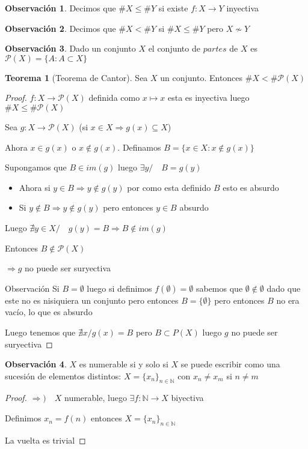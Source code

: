\documentclass[12pt]{article}
\newcommand{\N}{\mathbb{N}}
\newcommand{\Ra}{\Rightarrow}
\newcommand{\ra}{\rightarrow}
\theoremstyle{definition}
\newtheorem*{remark}{Observación}
\newtheorem{theorem}{Teorema}
\begin{document}
\begin{remark}
  Decimos que $\# X \leq \# Y$ si existe $f:X \ra Y$ inyectiva
\end{remark}
\begin{remark}
  Decimos que $\# X < \# Y$ si $\# X \leq \# Y$ pero $X \nsim Y$
\end{remark}

\begin{remark}
  Dado un conjunto $X$ el conjunto de $partes$ de $X$ es $\mathcal{P}(X) = \{A : A \subset X \}$
\end{remark}

\begin{theorem}[Teorema de Cantor]
Sea $X$ un conjunto. Entonces $\# X < \# \mathcal{P}(X)$

\begin{proof}
  $f:X \ra \mathcal{P}(X)$ definida como $x \mapsto {x}$ esta es inyectiva luego $\# X \leq \# \mathcal{P}(X)$

Sea $g: X \ra \mathcal{P}(X)$ (si $ x \in X  \Ra g(x) \subseteq X$)

Ahora $x \in g(x)$ o $x \notin g(x)$. Definamos $B =\{x \in X : x \notin g(x)\}$

Supongamos que $B \in im(g)$ luego $\exists y / \quad B=g(y)$ 
\begin{itemize}
\item Ahora si $y \in B \Ra y \notin g(y)$ por como esta definido $B$ esto es absurdo

\item Si $y \notin B \Ra y \notin g(y)$ pero entonces $y \in B$ absurdo
\end{itemize}

Luego $\nexists y \in X / \quad g(y) = B \Ra B \notin im(g)$ 

Entonces $B \notin \mathcal{P}(X)$

$\Ra g$ no puede ser suryectiva

Observación Si $B = \emptyset$ luego si definimos $f(\emptyset) = \emptyset$ sabemos que $\emptyset \notin \emptyset$ dado que este no es nisiquiera un conjunto pero entonces $B=\{\emptyset \}$ pero entonces $B$ no era vacío, lo que es absurdo

Luego tenemos que $\nexists x / g(x) = B $ pero $B \subset P(X)$ luego $g$ no puede ser suryectiva
\end{proof}
\end{theorem}

\begin{remark}
  $X$ es numerable si y solo si $X$ se puede escribir como una sucesión de elementos distintos: $X = \{x_{n}\}_{n \in \N}$ con $x_{n} \neq x_{m}$ si $n \neq m$

  \begin{proof}
  $\Ra ) \quad X$ numerable, luego $ \exists f: \N \ra X$ biyectiva

  Definimos $x_{n} = f(n)$ entonces $X= \{x_{n}\}_{n \in \N}$
  
La vuelta es trivial
\end{proof}

\end{remark}
\end{document}
